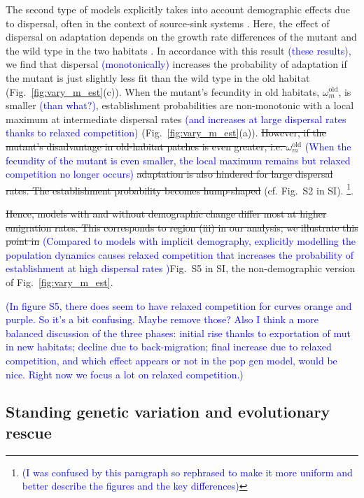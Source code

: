 \documentclass[a4paper,11pt]{article}
\newcommand{\francois}[1]{\textcolor{blue}{(#1)}}
\newcommand{\chg}[1]{\textcolor{change}{#1}}
\begin{document}
The second type of models explicitly takes into account demographic effects due to dispersal, often in the context of source-sink systems \citep{holt_1985,pulliam_1988}. 
Here, the effect of dispersal on adaptation depends on the growth rate differences of the mutant and the wild type in the two habitats \citep{kawecki_2000}. 
In accordance with this result \francois{these results}, we find that dispersal \francois{monotonically} increases the probability of adaptation if the mutant is just slightly less fit than the wild type in the old habitat %
(Fig.~\ref{fig:vary_m_est}(c)). 
When the mutant's fecundity in old habitats, $\omega^\text{old}_m$, is smaller \francois{than what?}, establishment probabilities are non-monotonic with a local maximum at intermediate dispersal rates \francois{and increases at large dispersal rates thanks to relaxed competition} (Fig.~\ref{fig:vary_m_est}(a)). 
\st{However, if the mutant's disadvantage in old-habitat patches is even greater, i.e. $\omega^\text{old}_m$} \francois{When the fecundity of the mutant is even smaller, the local maximum remains but relaxed competition no longer occurs} \st{adaptation is also hindered for large dispersal rates. The establishment probability becomes hump-shaped } (cf. Fig.~S2 in SI). \footnote{\francois{I was confused by this paragraph so rephrased to make it more uniform and better describe the figures and the key differences}}.

\st{Hence, models with and without demographic change differ most at higher emigration rates. This corresponds to region (iii) in our analysis; we illustrate this point in} \francois{Compared to models with implicit demography, explicitly modelling the population dynamics causes relaxed competition that increases the probability of establishment at high dispersal rates }Fig.~S5 in SI, the non-demographic version of Fig.~\ref{fig:vary_m_est}. 

\francois{In figure S5, there does seem to have relaxed competition for curves orange and purple. So it's a bit confusing. Maybe remove those? Also I think a more balanced discussion of the three phases: initial rise thanks to exportation of mut in new habitats; decline due to back-migration; final increase due to relaxed competition, and which effect appears or not in the pop gen model, would be nice. Right now we focus a lot on relaxed competition.}


\subsection*{\chg{Standing genetic variation} and evolutionary rescue}
\end{document}
